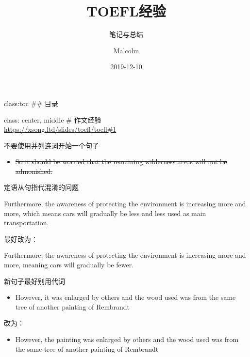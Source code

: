 \documentclass[ignorenonframetext,]{beamer}
\title{TOEFL经验}
\subtitle{笔记与总结}
\author{\href{https://xsong.ltd/}{Malcolm}}
\date{2019-12-10}
\providecommand{\tightlist}{%
  \setlength{\itemsep}{0pt}\setlength{\parskip}{0pt}}
\begin{document}
\frame{\titlepage}

\begin{frame}

class:toc \#\# 目录

\end{frame}

\begin{frame}

class: center, middle \# 作文经验\\
\url{https://xsong.ltd/slides/toefl/toefl\#1}

\begin{block}{不要使用并列连词开始一个句子}

\begin{itemize}
\tightlist
\item
  \sout{So it should be worried that the remaining wilderness areas will
  not be admonished.}
\end{itemize}

\end{block}

\end{frame}

\begin{frame}{定语从句指代混淆的问题}
\protect\hypertarget{ux5b9aux8bedux4eceux53e5ux6307ux4ee3ux6df7ux6dc6ux7684ux95eeux9898}{}

Furthermore, the awareness of protecting the environment is increasing
more and more, which means cars will gradually be less and less used as
main transportation.

最好改为：

Furthermore, the awareness of protecting the environment is increasing
more and more, meaning cars will gradually be fewer.

\end{frame}

\begin{frame}

\begin{block}{新句子最好别用代词}

\begin{itemize}
\tightlist
\item
  However, it was enlarged by others and the wood used was from the same
  tree of another painting of Rembrandt
\end{itemize}

改为：

\begin{itemize}
\tightlist
\item
  However, the painting was enlarged by others and the wood used was
  from the same tree of another painting of Rembrandt
\end{itemize}

\end{block}

\end{frame}
\end{document}
